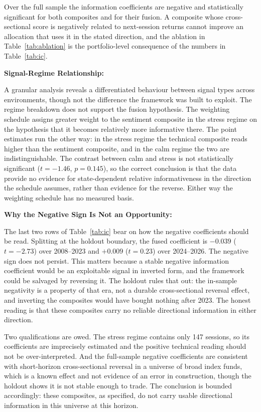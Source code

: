 Over the full sample the information coefficients are negative and statistically
significant for both composites and for their fusion. A composite whose cross-sectional
score is negatively related to next-session returns cannot improve an allocation that
uses it in the stated direction, and the ablation in Table~\ref{tab:ablation} is the
portfolio-level consequence of the numbers in Table~\ref{tab:ic}.

\textbf{Signal-Regime Relationship:}

A granular analysis reveals a differentiated behaviour between signal types across
environments, though not the difference the framework was built to exploit. The regime
breakdown does not support the fusion hypothesis. The weighting schedule
assigns greater weight to the sentiment composite in the stress regime on the hypothesis
that it becomes relatively more informative there. The point estimates run the other way:
in the stress regime the technical composite reads higher than the sentiment composite,
and in the calm regime the two are indistinguishable. The contrast between calm and
stress is not statistically significant ($t = -1.46$, $p = 0.145$), so the correct
conclusion is that the data provide no evidence for state-dependent relative
informativeness in the direction the schedule assumes, rather than evidence for the
reverse. Either way the weighting schedule has no measured basis.

\textbf{Why the Negative Sign Is Not an Opportunity:}

The last two rows of Table~\ref{tab:ic} bear on how the negative coefficients should be
read. Splitting at the holdout boundary, the fused coefficient is $-0.039$ ($t = -2.73$)
over 2008--2023 and $+0.009$ ($t = 0.23$) over 2024--2026. The negative sign does not
persist. This matters because a stable negative information coefficient would be an
exploitable signal in inverted form, and the framework could be salvaged by reversing it.
The holdout rules that out: the in-sample negativity is a property of that era, not a
durable cross-sectional reversal effect, and inverting the composites would have bought
nothing after 2023. The honest reading is that these composites carry no reliable
directional information in either direction.

Two qualifications are owed. The stress regime contains only 147 sessions, so its
coefficients are imprecisely estimated and the positive technical reading should not be
over-interpreted. And the full-sample negative coefficients are consistent with
short-horizon cross-sectional reversal in a universe of broad index funds, which is a
known effect and not evidence of an error in construction, though the holdout shows it is
not stable enough to trade. The conclusion is bounded accordingly: these composites, as
specified, do not carry usable directional information in this universe at this horizon.


